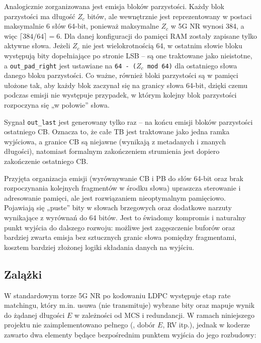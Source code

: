 Analogicznie zorganizowana jest emisja bloków parzystości. Każdy blok parzystości ma długość $Z_c$ bitów, ale wewnętrznie jest reprezentowany w postaci maksymalnie 6 słów 64-bit, ponieważ maksymalne $Z_c$ w 5G NR wynosi 384, a więc $\lceil 384/64\rceil = 6$. Dla danej konfiguracji do pamięci RAM zostały zapisane tylko aktywne słowa. Jeżeli $Z_c$ nie jest wielokrotnością 64, w ostatnim słowie bloku występują bity dopełniające po stronie LSB -- są one traktowane jako nieistotne, a \texttt{out\_pad\_right} jest ustawiane na \texttt{64 - ($Z_c$ mod 64)} dla ostatniego słowa danego bloku parzystości. Co ważne, również bloki parzystości są w pamięci ułożone tak, aby każdy blok zaczynał się na granicy słowa 64-bit, dzięki czemu podczas emisji nie występuje przypadek, w którym kolejny blok parzystości rozpoczyna się „w połowie” słowa.

Sygnał \texttt{out\_last} jest generowany tylko raz -- na końcu emisji bloków parzystości ostatniego CB. Oznacza to, że całe TB jest traktowane jako jedna ramka wyjściowa, a granice CB są niejawne (wynikają z metadanych i znanych długości), natomiast formalnym zakończeniem strumienia jest dopiero zakończenie ostatniego CB.

Przyjęta organizacja emisji (wyrównywanie CB i PB do słów 64-bit oraz brak rozpoczynania kolejnych fragmentów w środku słowa) upraszcza sterowanie i adresowanie pamięci, ale jest rozwiązaniem nieoptymalnym pamięciowo. Pojawiają się „puste” bity w słowach brzegowych oraz dodatkowe narzuty wynikające z wyrównań do 64 bitów. Jest to świadomy kompromis i naturalny punkt wyjścia do dalszego rozwoju: możliwe jest zagęszczenie buforów  oraz bardziej zwarta emisja bez sztucznych granic słowa pomiędzy fragmentami, kosztem bardziej złożonej logiki składania danych na wyjściu.





\subsection{Zalążki }
\label{subsec:ldpc_enc_puncturing_stub}

W standardowym torze 5G NR po kodowaniu LDPC występuje etap rate matchingu, który m.in. usuwa (nie transmituje) wybrane bity oraz mapuje wynik do żądanej długości $E$ w zależności od MCS i redundancji. W ramach niniejszego projektu nie zaimplementowano pełnego  (, dobór $E$, RV itp.), jednak w koderze zawarto dwa elementy będące bezpośrednim punktem wyjścia do jego rozbudowy:

